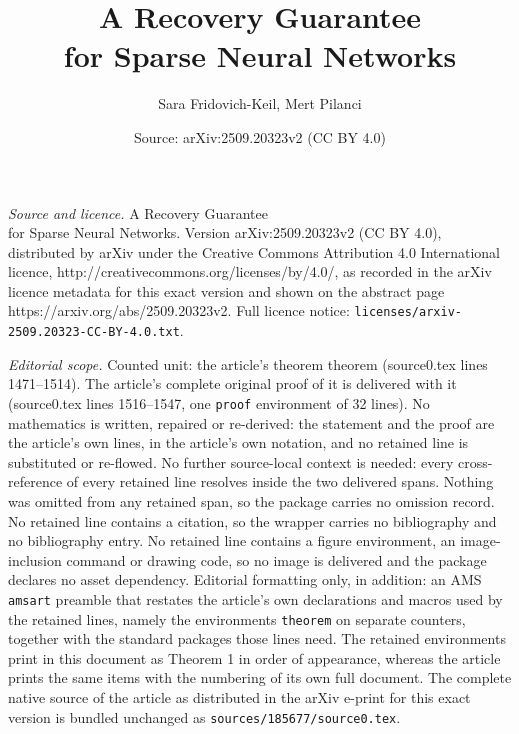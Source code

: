\documentclass[10pt,a4paper]{amsart}
\title{A Recovery Guarantee\\for Sparse Neural Networks}
\author{Sara Fridovich-Keil, Mert Pilanci}
\date{Source: arXiv:2509.20323v2 (CC BY 4.0)}
\begin{document}
\maketitle

\noindent\emph{Source and licence.} A Recovery Guarantee\\for Sparse Neural Networks. Version arXiv:2509.20323v2 (CC BY 4.0), distributed by arXiv under the Creative Commons Attribution 4.0 International licence, http://creativecommons.org/licenses/by/4.0/, as recorded in the arXiv licence metadata for this exact version and shown on the abstract page https://arxiv.org/abs/2509.20323v2. Full licence notice: \texttt{licenses/arxiv-2509.20323-CC-BY-4.0.txt}.\par\smallskip

\noindent\textit{Editorial scope.} Counted unit: the article's theorem theorem (source0.tex lines 1471--1514). The article's complete original proof of it is delivered with it (source0.tex lines 1516--1547, one \texttt{proof} environment of 32 lines). No mathematics is written, repaired or re-derived: the statement and the proof are the article's own lines, in the article's own notation, and no retained line is substituted or re-flowed.  No further source-local context is needed: every cross-reference of every retained line resolves inside the two delivered spans.  Nothing was omitted from any retained span, so the package carries no omission record.  No retained line contains a citation, so the wrapper carries no bibliography and no bibliography entry.  No retained line contains a figure environment, an image-inclusion command or drawing code, so no image is delivered and the package declares no asset dependency.  Editorial formatting only, in addition: an AMS \texttt{amsart} preamble that restates the article's own declarations and macros used by the retained lines, namely the environments \texttt{theorem} on separate counters, together with the standard packages those lines need.  The retained environments print in this document as Theorem 1 in order of appearance, whereas the article prints the same items with the numbering of its own full document.  The complete native source of the article as distributed in the arXiv e-print for this exact version is bundled unchanged as \texttt{sources/185677/source0.tex}.
\end{document}
